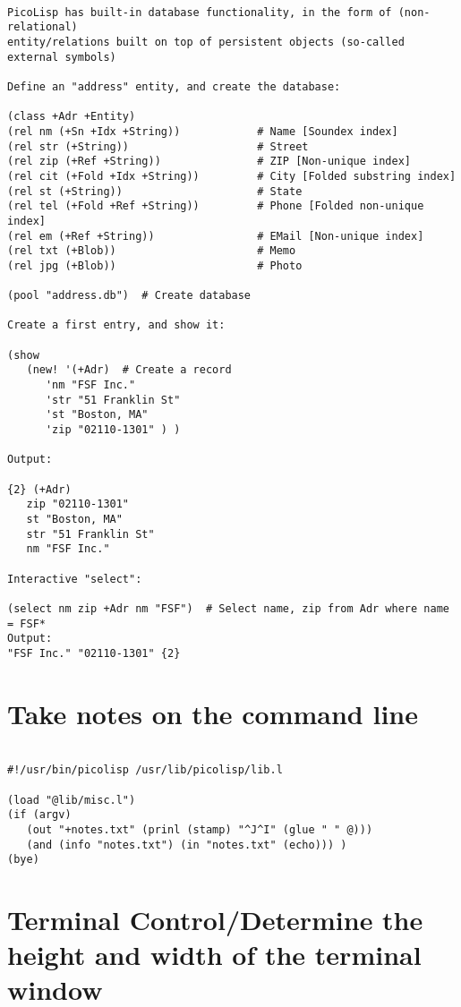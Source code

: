 \begin{verbatim}

PicoLisp has built-in database functionality, in the form of (non-relational)
entity/relations built on top of persistent objects (so-called external symbols)

Define an "address" entity, and create the database:

(class +Adr +Entity)
(rel nm (+Sn +Idx +String))            # Name [Soundex index]
(rel str (+String))                    # Street
(rel zip (+Ref +String))               # ZIP [Non-unique index]
(rel cit (+Fold +Idx +String))         # City [Folded substring index]
(rel st (+String))                     # State
(rel tel (+Fold +Ref +String))         # Phone [Folded non-unique index]
(rel em (+Ref +String))                # EMail [Non-unique index]
(rel txt (+Blob))                      # Memo
(rel jpg (+Blob))                      # Photo

(pool "address.db")  # Create database

Create a first entry, and show it:

(show
   (new! '(+Adr)  # Create a record
      'nm "FSF Inc."
      'str "51 Franklin St"
      'st "Boston, MA"
      'zip "02110-1301" ) )

Output:

{2} (+Adr)
   zip "02110-1301"
   st "Boston, MA"
   str "51 Franklin St"
   nm "FSF Inc."

Interactive "select":

(select nm zip +Adr nm "FSF")  # Select name, zip from Adr where name = FSF*
Output:
"FSF Inc." "02110-1301" {2}

\end{verbatim}

\section*{Take notes on the command line}

\begin{verbatim}

#!/usr/bin/picolisp /usr/lib/picolisp/lib.l

(load "@lib/misc.l")
(if (argv)
   (out "+notes.txt" (prinl (stamp) "^J^I" (glue " " @)))
   (and (info "notes.txt") (in "notes.txt" (echo))) )
(bye)

\end{verbatim}

\section*{Terminal Control/Determine the height and width of the terminal window}


